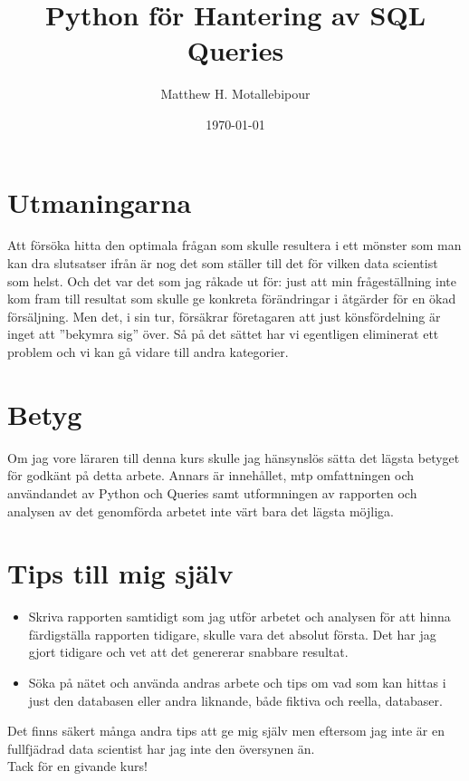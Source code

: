 \documentclass[10pt]{article}
\begin{document}

\title{Python för Hantering av SQL Queries}
\author{Matthew H. Motallebipour}
\date{\today}
\maketitle

\section{Utmaningarna}

Att försöka hitta den optimala frågan som skulle resultera i ett mönster som man kan dra slutsatser ifrån är nog det som ställer till det för vilken data scientist som helst. Och det var det som jag råkade ut för: just att min frågeställning inte kom fram till resultat som skulle ge konkreta förändringar i åtgärder för en ökad försäljning. Men det, i sin tur, försäkrar företagaren att just könsfördelning är inget att ''bekymra sig'' över. Så på det sättet har vi egentligen eliminerat ett problem och vi kan gå vidare till andra kategorier.

\section{Betyg}

Om jag vore läraren till denna kurs skulle jag hänsynslös sätta det lägsta betyget för godkänt på detta arbete. Annars är innehållet, mtp omfattningen och användandet av Python och Queries samt utformningen av rapporten och analysen av det genomförda arbetet inte värt bara det lägsta möjliga.

\section{Tips till mig själv}

\begin{itemize}
	\item Skriva rapporten samtidigt som jag utför arbetet och analysen för att hinna färdigställa rapporten tidigare, skulle vara det absolut första. Det har jag gjort tidigare och vet att det genererar snabbare resultat.
	\item Söka på nätet och använda andras arbete och tips om vad som kan hittas i just den databasen eller andra liknande, både fiktiva och reella, databaser.
\end{itemize}

\noindent Det finns säkert många andra tips att ge mig själv men eftersom jag inte är en fullfjädrad data scientist har jag inte den översynen än.\\

\noindent Tack för en givande kurs!
\end{document}
